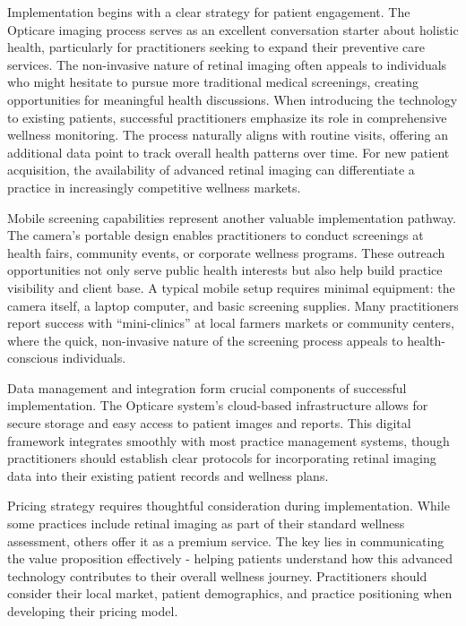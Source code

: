 \documentclass[
  Letterpaper,
]{scrbook}
\begin{document}
Implementation begins with a clear strategy for patient engagement. The
Opticare imaging process serves as an excellent conversation starter
about holistic health, particularly for practitioners seeking to expand
their preventive care services. The non-invasive nature of retinal
imaging often appeals to individuals who might hesitate to pursue more
traditional medical screenings, creating opportunities for meaningful
health discussions. When introducing the technology to existing
patients, successful practitioners emphasize its role in comprehensive
wellness monitoring. The process naturally aligns with routine visits,
offering an additional data point to track overall health patterns over
time. For new patient acquisition, the availability of advanced retinal
imaging can differentiate a practice in increasingly competitive
wellness markets.

Mobile screening capabilities represent another valuable implementation
pathway. The camera's portable design enables practitioners to conduct
screenings at health fairs, community events, or corporate wellness
programs. These outreach opportunities not only serve public health
interests but also help build practice visibility and client base. A
typical mobile setup requires minimal equipment: the camera itself, a
laptop computer, and basic screening supplies. Many practitioners report
success with ``mini-clinics'' at local farmers markets or community
centers, where the quick, non-invasive nature of the screening process
appeals to health-conscious individuals.

Data management and integration form crucial components of successful
implementation. The Opticare system's cloud-based infrastructure allows
for secure storage and easy access to patient images and reports. This
digital framework integrates smoothly with most practice management
systems, though practitioners should establish clear protocols for
incorporating retinal imaging data into their existing patient records
and wellness plans.

Pricing strategy requires thoughtful consideration during
implementation. While some practices include retinal imaging as part of
their standard wellness assessment, others offer it as a premium
service. The key lies in communicating the value proposition effectively
- helping patients understand how this advanced technology contributes
to their overall wellness journey. Practitioners should consider their
local market, patient demographics, and practice positioning when
developing their pricing model.
\end{document}
